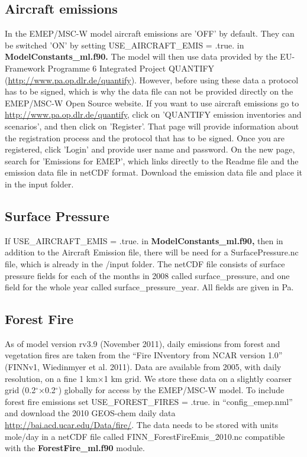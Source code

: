 \subsection{Aircraft emissions}
In the EMEP/MSC-W model aircraft emissions are 'OFF' by default. 
They can be switched 'ON' by setting USE\_AIRCRAFT\_EMIS = .true. in { \bf ModelConstants\_ml.f90.} 
The model will then use data provided by the EU-Framework Programme 6 Integrated 
Project QUANTIFY (\url{http://www.pa.op.dlr.de/quantify}). However, before using 
these data a protocol has to be signed, which is why the data file can not be provided 
directly on the EMEP/MSC-W Open Source website. If you want to use aircraft emissions go to 
\url{http://www.pa.op.dlr.de/quantify}, click on 'QUANTIFY emission inventories and scenarios', 
and then click on 'Register'. That page will provide information about the registration 
process and the protocol that has to be signed. Once you are registered, click 'Login' and 
provide user name and password. On the new page, search for 'Emissions for EMEP', which 
links directly to the Readme file and the emission data file in netCDF format. Download the 
emission data file and place it in the input folder.

\subsection{Surface Pressure}

If USE\_AIRCRAFT\_EMIS = .true. in { \bf ModelConstants\_ml.f90,} then in addition to the Aircraft 
Emission file, there will be need for a SurfacePressure.nc file, which is already in the /input folder. 
The netCDF file consists of surface pressure fields for each of the months in 2008 called surface\_pressure, 
and one field for the whole year called surface\_pressure\_year. All fields are given in Pa. 

\subsection{Forest Fire}
As of model version rv3.9 (November 2011), daily emissions from forest and vegetation fires are taken from the “Fire INventory from NCAR version 1.0” (FINNv1,
Wiedinmyer et al. 2011). Data are available from 2005, with daily resolution, on a fine 1 km×1 km grid. We store these data on a slightly coarser grid (0.2$^\circ$×0.2$^\circ$) globally for access by the EMEP/MSC-W model. To include forest fire emissions set 
USE\_FOREST\_FIRES = .true. in ``config\_emep.nml'' and download the 
2010 GEOS-chem daily data \url{http://bai.acd.ucar.edu/Data/fire/}. The data needs to be stored with units mole/day in a netCDF file called FINN\_ForestFireEmis\_2010.nc 
compatible with the { \bf ForestFire\_ml.f90 } module. 


